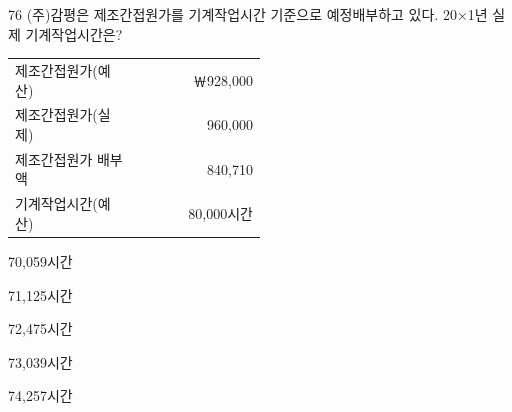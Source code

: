 \begin{question}{76}
(주)감평은 제조간접원가를 기계작업시간 기준으로 예정배부하고 있다. 20×1년 실제 기계작업시간은?

{\small\centering\begin{tabular}{|p{0.5\linewidth}|r|}\hline
제조간접원가(예산) & ￦928,000 \\
제조간접원가(실제) & 960,000 \\
제조간접원가 배부액 & 840,710 \\
기계작업시간(예산) & 80,000시간 \\ \hline
\end{tabular}\par}
\vspace{4pt}
\begin{choices}
  \item 70,059시간
  \item 71,125시간
  \item 72,475시간
  \item 73,039시간
  \item 74,257시간
\end{choices}
\end{question}
